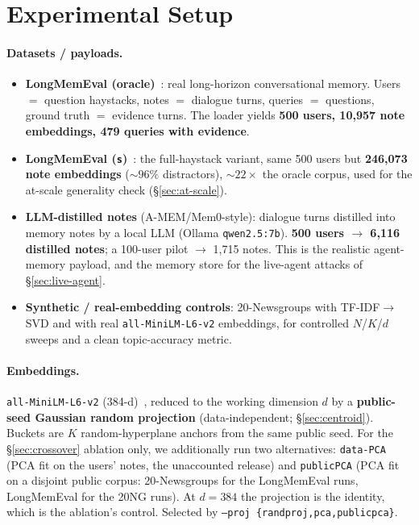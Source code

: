 \documentclass[pdflatex,sn-mathphys-num,12pt]{sn-jnl}
\theoremstyle{thmstyleone}%
\theoremstyle{thmstyletwo}%
\theoremstyle{thmstylethree}%
\newcommand{\secref}[1]{\S\ref{#1}}
\begin{document}
\section{Experimental Setup}\label{sec:setup}

\paragraph{Datasets / payloads.}
\begin{itemize}
  \item \textbf{LongMemEval (oracle)}~\cite{wu2024longmemeval}: real long-horizon
    conversational memory. Users $=$ question haystacks, notes $=$ dialogue turns,
    queries $=$ questions, ground truth $=$ evidence turns. The loader yields
    \textbf{500 users, 10{,}957 note embeddings, 479 queries with evidence}.
  \item \textbf{LongMemEval (\texttt{s})}~\cite{wu2024longmemeval}: the full-haystack
    variant, same 500 users but \textbf{246{,}073 note embeddings} (${\sim}96\%$
    distractors), ${\sim}22\times$ the oracle corpus, used for the at-scale generality
    check (\secref{sec:at-scale}).
  \item \textbf{LLM-distilled notes} (A-MEM/Mem0-style): dialogue turns distilled into
    memory notes by a local LLM (Ollama \texttt{qwen2.5:7b}). \textbf{500 users
    $\to$ 6{,}116 distilled notes}; a 100-user pilot $\to$ 1{,}715 notes. This is the
    realistic agent-memory payload, and the memory store for the live-agent attacks of
    \secref{sec:live-agent}.
  \item \textbf{Synthetic / real-embedding controls}: 20-Newsgroups with
    TF-IDF$\to$SVD and with real \texttt{all-MiniLM-L6-v2} embeddings, for controlled
    $N$/$K$/$d$ sweeps and a clean topic-accuracy metric.
\end{itemize}

\paragraph{Embeddings.} \texttt{all-MiniLM-L6-v2} (384-d)~\cite{reimers2019sbert},
reduced to the working dimension $d$ by a \textbf{public-seed Gaussian random
projection} (data-independent; \secref{sec:centroid}). Buckets are $K$
random-hyperplane anchors from the same public seed. For the \secref{sec:crossover}
ablation only, we additionally run two alternatives: \texttt{data-PCA} (PCA fit on the
users' notes, the unaccounted release) and \texttt{publicPCA} (PCA fit on a disjoint
public corpus: 20-Newsgroups for the LongMemEval runs, LongMemEval for the 20NG runs).
At $d = 384$ the projection is the identity, which is the ablation's control. Selected
by \texttt{--proj \{randproj,pca,publicpca\}}.
\end{document}
